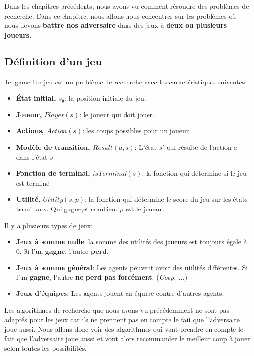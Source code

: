 Dans les chapitres précédents, nous avons vu comment résoudre des problèmes de recherche. 
Dans ce chapitre, nous allons nous concentrer sur les problèmes où nous devons \textbf{battre nos adversaire} 
dans des jeux à \textbf{deux ou plusieurs joueurs}.

\subsection{Définition d'un jeu} %
\label{sub:definition_d_un_jeu}

\begin{definition}{Jeu}{game}
    Un jeu est un problème de recherche avec les caractéristiques suivantes:
    \begin{itemize}
        \item \textbf{État initial, $s_0$}: la position initiale du jeu.
        \item \textbf{Joueur, $Player(s)$}: le joueur qui doit jouer.
        \item \textbf{Actions, $Action(s)$}: les coups possibles pour un joueur.
        \item \textbf{Modèle de transition, $Result(a, s)$}: L'état $s'$ qui résulte de l'action $a$ dans l'état $s$
        \item \textbf{Fonction de terminal, $isTerminal(s)$}: la fonction qui détermine si le jeu est terminé
        \item \textbf{Utilité, $Utility(s, p)$}: la fonction qui détermine le score du jeu sur les états terminaux. Qui gagne,et combien.
            $p$ est le joueur.
    \end{itemize} 
\end{definition}
\begin{note}
    Il y a plusieurs types de jeux:
    \begin{itemize}
        \item \textbf{Jeux à somme nulle}: la somme des utilités des joueurs est toujours égale à 0. Si l'un \textbf{gagne}, l'autre \textbf{perd}.
        \item \textbf{Jeux à somme général}: Les agents peuvent avoir des utilités différentes. Si l'un \textbf{gagne}, l'autre \textbf{ne perd pas forcément}. (\textit{Coop}, \textit{...})
        \item \textbf{Jeux d'équipes}: Les agents jouent en équipe contre d'autres agents.
    \end{itemize}
\end{note}
Les algorithmes de recherche que nous avons vu précédemment ne sont pas adaptés pour les jeux car ils ne prennent pas en compte le fait que l'adversaire joue aussi. 
Nous allons donc voir des algorithmes qui vont prendre en compte le fait que l'adversaire joue aussi et vont alors recommander le meilleur coup à jouer selon toutes les possibilités.

